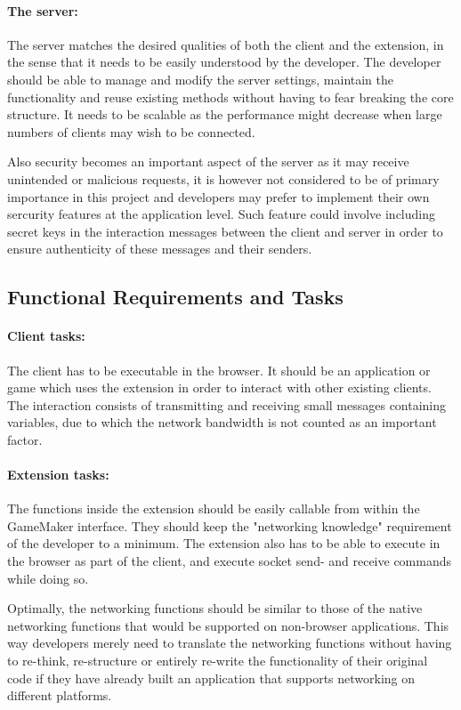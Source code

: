 \documentclass[bsc,frontabs,twoside,singlespacing,parskip,deptreport]{infthesis}     %
\begin{document}
\paragraph*{The server:}
The server matches the desired qualities of both the client and the extension, in the sense that it needs to be easily understood by the developer. The developer should be able to manage and modify the server settings, maintain the functionality and reuse existing methods without having to fear breaking the core structure. It needs to be scalable as the performance might decrease when large numbers of clients may wish to be connected. 

Also security becomes an important aspect of the server as it may receive unintended or malicious requests, it is however not considered to be of primary importance in this project and developers may prefer to implement their own sercurity features at the application level. Such feature could involve including secret keys in the interaction messages between the client and server in order to ensure authenticity of these messages and their senders.

\subsection{Functional Requirements and Tasks}
\paragraph*{Client tasks:}
The client has to be executable in the browser. It should be an application or game which uses the extension in order to interact with other existing clients. The interaction consists of transmitting and receiving small messages containing variables, due to which the network bandwidth is not counted as an important factor.

\paragraph*{Extension tasks:}
The functions inside the extension should be easily callable from within the GameMaker interface. They should keep the "networking knowledge" requirement of the developer to a minimum. The extension also has to be able to execute in the browser as part of the client, and execute socket send- and receive commands while doing so.

Optimally, the networking functions should be similar to those of the native networking functions that would be supported on non-browser applications. This way developers merely need to translate the networking functions without having to re-think, re-structure or entirely  re-write the functionality of their original code if they have already built an application that supports networking on different platforms.
\end{document}
